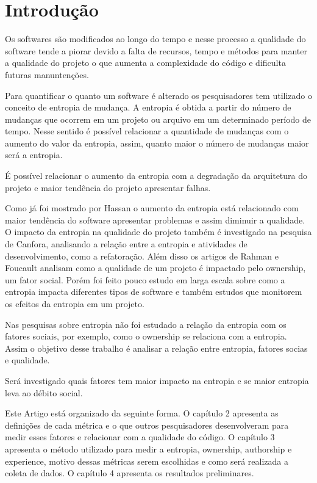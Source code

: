 \chapter{Introdução}

Os softwares são modificados ao longo do tempo e nesse processo a qualidade do software tende a piorar devido a falta de recursos, tempo e métodos para manter a qualidade do projeto o que aumenta a complexidade do código e dificulta futuras manuntenções.

Para quantificar o quanto um software é alterado os pesquisadores tem utilizado o conceito de entropia de mudança. A entropia é obtida a partir do número de mudanças que ocorrem em um projeto ou arquivo em um determinado período de tempo. Nesse sentido é possível relacionar a quantidade de mudanças com o aumento do valor da entropia, assim, quanto maior o número de mudanças maior será a entropia.

É possível relacionar o aumento da entropia com a degradação da arquitetura do projeto e maior tendência do projeto apresentar falhas.

Como já foi mostrado por Hassan o aumento da entropia está relacionado com maior tendência do software apresentar problemas e assim diminuir a qualidade. O impacto da entropia na qualidade do projeto também é investigado na pesquisa de Canfora, analisando a relação entre a entropia e atividades de desenvolvimento, como a refatoração. Além disso os artigos de Rahman e Foucault analisam como a qualidade de um projeto é impactado pelo ownership, um fator social. Porém foi feito pouco estudo em larga escala sobre como a entropia impacta diferentes tipos de software e também estudos que monitorem os efeitos da entropia em um projeto.

Nas pesquisas sobre entropia não foi estudado a relação da entropia com os fatores sociais, por exemplo, como o ownership se relaciona com a entropia. Assim o objetivo desse trabalho é analisar a relação entre entropia, fatores socias e qualidade.

Será investigado quais fatores tem maior impacto na entropia e se maior entropia leva ao débito social.

Este Artigo está organizado da seguinte forma. O capítulo 2 apresenta as definições de cada métrica e o que outros pesquisadores desenvolveram para medir esses fatores e relacionar com a qualidade do código. O capítulo 3 apresenta o método utilizado para medir a entropia, ownership, authorship e experience, motivo dessas métricas serem escolhidas e como será realizada a coleta de dados. O capítulo 4 apresenta os resultados preliminares.